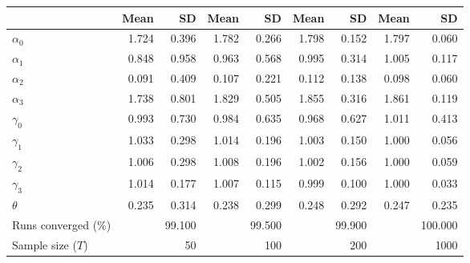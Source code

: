 
\begin{tabular}[t]{lrrrrrrrr}
\toprule
  & Mean & SD & Mean  & SD  & Mean   & SD   & Mean    & SD   \\
\midrule
$\alpha_{0}$ & 1.724 & 0.396 & 1.782 & 0.266 & 1.798 & 0.152 & 1.797 & 0.060\\
$\alpha_{1}$ & 0.848 & 0.958 & 0.963 & 0.568 & 0.995 & 0.314 & 1.005 & 0.117\\
$\alpha_{2}$ & 0.091 & 0.409 & 0.107 & 0.221 & 0.112 & 0.138 & 0.098 & 0.060\\
$\alpha_{3}$ & 1.738 & 0.801 & 1.829 & 0.505 & 1.855 & 0.316 & 1.861 & 0.119\\
$\gamma_{0}$ & 0.993 & 0.730 & 0.984 & 0.635 & 0.968 & 0.627 & 1.011 & 0.413\\
$\gamma_{1}$ & 1.033 & 0.298 & 1.014 & 0.196 & 1.003 & 0.150 & 1.000 & 0.056\\
$\gamma_{2}$ & 1.006 & 0.298 & 1.008 & 0.196 & 1.002 & 0.156 & 1.000 & 0.059\\
$\gamma_{3}$ & 1.014 & 0.177 & 1.007 & 0.115 & 0.999 & 0.100 & 1.000 & 0.033\\
$\theta$ & 0.235 & 0.314 & 0.238 & 0.299 & 0.248 & 0.292 & 0.247 & 0.235\\
Runs converged (\%) &  & 99.100 &  & 99.500 &  & 99.900 &  & 100.000\\
Sample size ($T$) &  & 50 &  & 100 &  & 200 &  & 1000\\
\bottomrule
\end{tabular}
